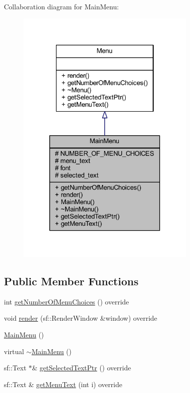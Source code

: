 Collaboration diagram for Main\+Menu\+:
\nopagebreak
\begin{figure}[H]
\begin{center}
\leavevmode
\includegraphics[width=248pt]{class_main_menu__coll__graph}
\end{center}
\end{figure}
\subsection*{Public Member Functions}
\begin{DoxyCompactItemize}
\item 
int \hyperlink{class_main_menu_aec279c06705f829ab154b9023ec838b3}{get\+Number\+Of\+Menu\+Choices} () override
\item 
void \hyperlink{class_main_menu_a1487a843dd8cf56374afa60a5b62e9bf}{render} (sf\+::\+Render\+Window \&window) override
\item 
\hyperlink{class_main_menu_a53eecf9d5ffd094f54ac4193e7e57eaf}{Main\+Menu} ()
\item 
virtual \hyperlink{class_main_menu_a0a19ddba3ac52bf39c09b579171c98f2}{$\sim$\+Main\+Menu} ()
\item 
sf\+::\+Text $\ast$\& \hyperlink{class_main_menu_abdf7a2a5bca4e2916bf9dc218c0de96f}{get\+Selected\+Text\+Ptr} () override
\item 
sf\+::\+Text \& \hyperlink{class_main_menu_ac5be2a5b81d51c79dfeab061263e00ba}{get\+Menu\+Text} (int i) override
\end{DoxyCompactItemize}
